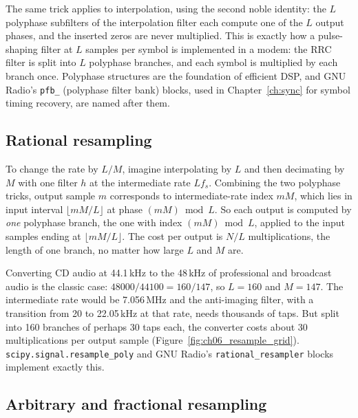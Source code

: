 The same trick applies to interpolation, using the second noble identity: the $L$ polyphase
subfilters of the interpolation filter each compute one of the $L$ output phases, and the inserted
zeros are never multiplied. This is exactly how a pulse-shaping filter at $L$ samples per symbol is
implemented in a modem: the RRC filter is split into $L$ polyphase branches, and each symbol is
multiplied by each branch once. Polyphase structures are the foundation of efficient DSP, and GNU
Radio's \texttt{pfb\_} (polyphase filter bank) blocks, used in Chapter~\ref{ch:sync} for symbol timing
recovery, are named after them.

\subsection{Rational resampling}

To change the rate by $L/M$, imagine interpolating by $L$ and then decimating by $M$ with one filter
$h$ at the intermediate rate $Lf_s$. Combining the two polyphase tricks, output sample $m$
corresponds to intermediate-rate index $mM$, which lies in input interval $\lfloor mM/L\rfloor$ at
phase $(mM)\bmod L$. So each output is computed by \emph{one} polyphase branch, the one with index
$(mM)\bmod L$, applied to the input samples ending at $\lfloor mM/L\rfloor$. The cost per output is
$N/L$ multiplications, the length of one branch, no matter how large $L$ and $M$ are.

Converting CD audio at 44.1\,kHz to the 48\,kHz of professional and broadcast audio is the classic
case: $48000/44100=160/147$, so $L=160$ and $M=147$. The intermediate rate would be 7.056\,MHz
and the anti-imaging filter, with a transition from 20 to 22.05\,kHz at that rate, needs thousands
of taps. But split into 160 branches of perhaps 30 taps each, the converter costs about 30
multiplications per output sample (Figure~\ref{fig:ch06_resample_grid}). \texttt{scipy.signal.resample\_poly}
and GNU Radio's \texttt{rational\_resampler} blocks implement exactly this.


\subsection{Arbitrary and fractional resampling}

